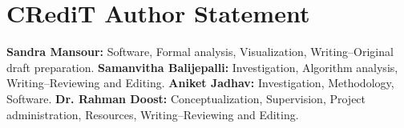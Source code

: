\documentclass[conference]{IEEEtran}
\begin{document}
\section{CRediT Author Statement}

\textbf{Sandra Mansour:} Software, Formal analysis, Visualization, Writing--Original draft preparation. \textbf{Samanvitha Balijepalli:} Investigation, Algorithm analysis, Writing--Reviewing and Editing. \textbf{Aniket Jadhav:} Investigation, Methodology, Software. \textbf{Dr. Rahman Doost:} Conceptualization, Supervision, Project administration, Resources, Writing--Reviewing and Editing.



\end{document}
